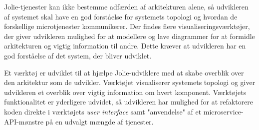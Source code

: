 Jolie-tjenester kan ikke bestemme adfærden af arkitekturen alene, så udvikleren af systemet skal have en god forståelse for systemets topologi og hvordan de forskellige microtjenester kommunikerer.
Der findes flere visualiseringsværktøjer, der giver udvikleren mulighed for at modellere og lave diagrammer for at formidle arkitekturen og vigtig information til andre.
Dette kræver at udvikleren har en god forståelse af det system, der bliver udviklet.

Et værktøj er udviklet til at hjælpe Jolie-udviklere med at skabe overblik over den arkitektur som de udvikler.
Værktøjet visualiserer systemets topologi og giver udvikleren et overblik over vigtig information om hvert komponent.
Værktøjets funktionalitet er yderligere udvidet, så udvikleren har mulighed for at refaktorere koden direkte i værktøjets \emph{user interface} samt "anvendelse" af et microservice-API-mønstre på en udvalgt mængde af tjenester.
